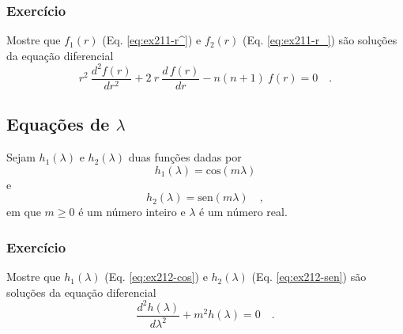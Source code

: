 \documentclass[10pt,a4paper,fleqn]{article}
\begin{document}
\begin{flushleft}
\dotfill
\end{flushleft}

\subsubsection{Exerc\'{i}cio}

Mostre que $f_{1}(r)$ (Eq. \ref{eq:ex211-r^}) e $f_{2}(r)$ (Eq. \ref{eq:ex211-r_}) 
s\~{a}o solu\c{c}\~{o}es da equa\c{c}\~{a}o diferencial
\begin{equation}
r^{2} \: \frac{d^{2} f(r)}{d r^{2}} + 2 \: r \: \frac{d \, f(r)}{d r} - n(n+1) \: f(r) = 0 \quad .
\label{eq:ex211-eqdif-r}
\end{equation}

\begin{flushleft}
\dotfill
\end{flushleft}

\subsection{Equa\c{c}\~{o}es de $\lambda$}

Sejam $h_{1}(\lambda)$ e $h_{2}(\lambda)$ duas fun\c{c}\~{o}es dadas por
\begin{equation}
h_{1}(\lambda) = \text{cos}(m \lambda)
\label{eq:ex212-cos}
\end{equation}
e
\begin{equation}
h_{2}(\lambda) = \text{sen}(m \lambda) \quad ,
\label{eq:ex212-sen}
\end{equation}
em que $m \geqslant 0$ \'{e} um n\'{u}mero inteiro e $\lambda$ \'{e} um n\'{u}mero real. 

\begin{flushleft}
\dotfill
\end{flushleft}

\subsubsection{Exerc\'{i}cio}

Mostre que
$h_{1}(\lambda)$ (Eq. \ref{eq:ex212-cos}) e $h_{2}(\lambda)$ (Eq. \ref{eq:ex212-sen}) 
s\~{a}o solu\c{c}\~{o}es da equa\c{c}\~{a}o diferencial
\begin{equation}
\frac{d^{2} h(\lambda)}{d \lambda^{2}} + m^{2} h(\lambda) = 0 \quad .
\label{eq:ex212-eqdif-lamb}
\end{equation}
\end{document}
